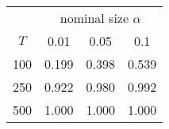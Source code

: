 % 
\begin{tabular}{cccc}
  \hline
  & \multicolumn{3}{c}{nominal size $\alpha$} \\
 $T$ & 0.01 & 0.05 & 0.1 \\
 \hline
100 & 0.199 & 0.398 & 0.539 \\ 
  250 & 0.922 & 0.980 & 0.992 \\ 
  500 & 1.000 & 1.000 & 1.000 \\ 
   \hline
\end{tabular}
